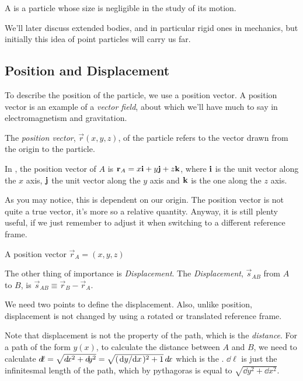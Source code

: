 \begin{definition}
    A  is a particle whose size is negligible in the study of its motion.
\end{definition}

We'll later discuss extended bodies, and in particular rigid ones in mechanics, but initially this idea 
of point particles will carry us far. 

\subsection{Position and Displacement}

To describe the position of the particle, we use a position vector. A position vector is an example of a 
\emph{vector field}, about which we'll have much to say in electromagnetism and gravitation.

\begin{definition}
    The \emph{position vector}, $\vec{r}(x, y, z)$, of the particle refers to the vector drawn from the origin to the particle.
\end{definition}


In , the position vector of $A$ is $\mathbf{\boldsymbol{r}}_A = x\mathbf{\boldsymbol{i}} + y\mathbf{\boldsymbol{j}} + z\mathbf{\boldsymbol{k}}$, where 
$\mathbf{\boldsymbol{i}}$ is the unit vector along the $x$ axis, $\mathbf{\boldsymbol{j}}$ the unit vector along the $y$ axis and $\mathbf{\boldsymbol{k}}$ is 
the one along the $z$ axis.

As you may notice, this is dependent on our origin. The position vector is not quite
a true vector, it's more so a relative quantity. Anyway, it is still plenty useful,
if we just remember to adjust it when switching to a different reference frame.

\begin{marginfigure}
    \hspace{-1.2em}
    \caption{A position vector $\vec{r}_A = (x, y, z)$} 
    \label{fig: position}
\end{marginfigure}

The other thing of importance is \emph{Displacement}. 
The  \emph{Displacement}, $\vec{s}_{AB}$ from $A$ to $B$, is $\vec{s}_{AB} \equiv \vec{r}_B - \vec{r}_A$.

We need two points to define the displacement. Also, unlike position, displacement 
is not changed by using a rotated or translated reference frame. 

Note that displacement is not the property of the path, which is the \emph{distance}. For a path 
of the form $y(x)$, to calculate the distance between $A$ and $B$, we need to calculate $\dd{\ell} = 
\sqrt{\dd{x}^2 + \dd{y}^2} = \sqrt{(\dv*{y}{x})^2 + 1}\dd{x}$ which is the .
$\dd{\ell}$ is just the infinitesmal length of the path, which by pythagoras is equal to $\sqrt{\dd{y}^2 + \dd{x}^2}$.  

